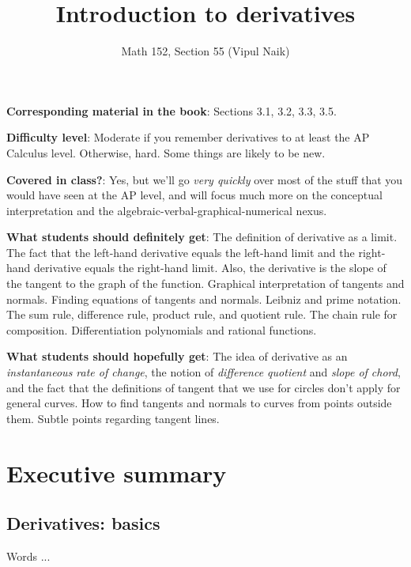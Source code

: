 \documentclass[10pt]{amsart}
\title{Introduction to derivatives}
\author{Math 152, Section 55 (Vipul Naik)}
\begin{document}
\maketitle

{\bf Corresponding material in the book}: Sections 3.1, 3.2, 3.3, 3.5.

{\bf Difficulty level}: Moderate if you remember derivatives to at
least the AP Calculus level. Otherwise, hard. Some things are likely
to be new.

{\bf Covered in class?}: Yes, but we'll go {\em very quickly} over
most of the stuff that you would have seen at the AP level, and will
focus much more on the conceptual interpretation and the
algebraic-verbal-graphical-numerical nexus.

{\bf What students should definitely get}: The definition of
derivative as a limit. The fact that the left-hand derivative equals
the left-hand limit and the right-hand derivative equals the
right-hand limit. Also, the derivative is the slope of the tangent to
the graph of the function. Graphical interpretation of tangents and
normals. Finding equations of tangents and normals. Leibniz and prime
notation. The sum rule, difference rule, product rule, and quotient
rule. The chain rule for composition. Differentiation polynomials and
rational functions.

{\bf What students should hopefully get}: The idea of derivative as an
{\em instantaneous rate of change}, the notion of {\em difference
quotient} and {\em slope of chord}, and the fact that the definitions
of tangent that we use for circles don't apply for general curves. How
to find tangents and normals to curves from points outside
them. Subtle points regarding tangent lines.

\section*{Executive summary}

\subsection{Derivatives: basics}

Words ...
\end{document}
